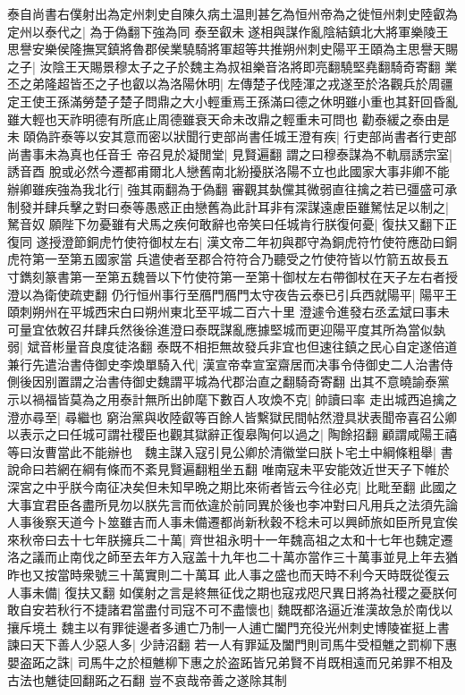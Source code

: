 泰自尚書右僕射出為定州刺史自陳久病土温則甚乞為恒州帝為之徙恒州刺史陸叡為定州以泰代之|{
	為于偽翻下強為同}
泰至叡未遂相與謀作亂陰結鎮北大將軍樂陵王思譽安樂侯隆撫冥鎮將魯郡侯業驍騎將軍超等共推朔州刺史陽平王頤為主思譽天賜之子|{
	汝陰王天賜景穆太子之子於魏主為叔祖樂音洛將即亮翻驍堅堯翻騎奇寄翻}
業丕之弟隆超皆丕之子也叡以為洛陽休明|{
	左傳楚子伐陸渾之戎遂至於洛觀兵於周疆定王使王孫滿勞楚子楚子問鼎之大小輕重焉王孫滿曰德之休明雖小重也其姧回昏亂雖大輕也天祚明德有所底止周德雖衰天命未改鼎之輕重未可問也}
勸泰緩之泰由是未頤偽許泰等以安其意而密以狀聞行吏部尚書任城王澄有疾|{
	行吏部尚書者行吏部尚書事未為真也任音壬}
帝召見於凝閒堂|{
	見賢遍翻}
謂之曰穆泰謀為不軌扇誘宗室|{
	誘音酉}
脫或必然今遷都甫爾北人戀舊南北紛擾朕洛陽不立也此國家大事非卿不能辦卿雖疾強為我北行|{
	強其兩翻為于偽翻}
審觀其埶儻其微弱直往擒之若已彊盛可承制發并肆兵擊之對曰泰等愚惑正由戀舊為此計耳非有深謀遠慮臣雖駑怯足以制之|{
	駑音奴}
願陛下勿憂雖有犬馬之疾何敢辭也帝笑曰任城肯行朕復何憂|{
	復扶又翻下正復同}
遂授澄節銅虎竹使符御杖左右|{
	漢文帝二年初與郡守為銅虎符竹使符應劭曰銅虎符第一至第五國家當兵遣使者至郡合符符合乃聽受之竹使符皆以竹箭五故長五寸鐫刻篆書第一至第五魏晉以下竹使符第一至第十御杖左右帶御杖在天子左右者授澄以為衛使疏吏翻}
仍行恒州事行至鴈門鴈門太守夜告云泰已引兵西就陽平|{
	陽平王頤刺朔州在平城西宋白曰朔州東北至平城二百六十里}
澄遽令進發右丞孟斌曰事未可量宜依敇召幷肆兵然後徐進澄曰泰既謀亂應據堅城而更迎陽平度其所為當似埶弱|{
	斌音彬量音良度徒洛翻}
泰既不相拒無故發兵非宜也但速往鎮之民心自定遂倍道兼行先遣治書侍御史李煥單騎入代|{
	漢宣帝幸宣室齋居而决事令侍御史二人治書侍側後因别置謂之治書侍御史魏謂平城為代郡治直之翻騎奇寄翻}
出其不意曉諭泰黨示以禍福皆莫為之用泰計無所出帥麾下數百人攻煥不克|{
	帥讀曰率}
走出城西追擒之澄亦尋至|{
	尋繼也}
窮治黨與收陸叡等百餘人皆繫獄民間帖然澄具狀表聞帝喜召公卿以表示之曰任城可謂社稷臣也觀其獄辭正復皋陶何以過之|{
	陶餘招翻}
顧謂咸陽王禧等曰汝曹當此不能辦也　魏主謀入寇引見公卿於清徽堂曰朕卜宅土中綱條粗舉|{
	書說命曰若網在綱有條而不紊見賢遍翻粗坐五翻}
唯南寇未平安能效近世天子下帷於深宮之中乎朕今南征决矣但未知早晩之期比來術者皆云今往必克|{
	比毗至翻}
此國之大事宜君臣各盡所見勿以朕先言而依違於前同異於後也李冲對曰凡用兵之法須先論人事後察天道今卜筮雖吉而人事未備遷都尚新秋穀不稔未可以興師旅如臣所見宜俟來秋帝曰去十七年朕擁兵二十萬|{
	齊世祖永明十一年魏高祖之太和十七年也魏定遷洛之議而止南伐之師至去年方入寇盖十九年也二十萬亦當作三十萬事並見上年去猶昨也又按當時衆號三十萬實則二十萬耳}
此人事之盛也而天時不利今天時既從復云人事未備|{
	復扶又翻}
如僕射之言是終無征伐之期也寇戎咫尺異日將為社稷之憂朕何敢自安若秋行不捷諸君當盡付司寇不可不盡懷也|{
	魏既都洛逼近淮漢故急於南伐以攘斥境土}
魏主以有罪徙邊者多逋亡乃制一人逋亡闔門充役光州刺史博陵崔挺上書諫曰天下善人少惡人多|{
	少詩沼翻}
若一人有罪延及闔門則司馬牛受桓魋之罰柳下惠嬰盗跖之誅|{
	司馬牛之於桓魋柳下惠之於盗跖皆兄弟賢不肖既相遠而兄弟罪不相及古法也魋徒回翻跖之石翻}
豈不哀哉帝善之遂除其制

